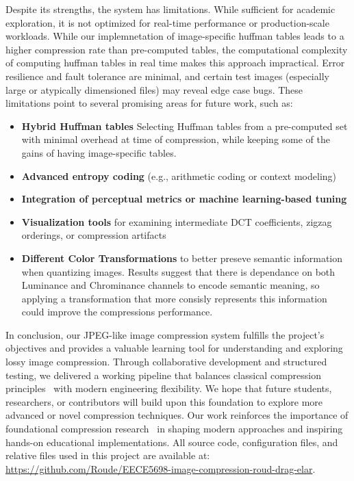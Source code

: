 Despite its strengths, the system has limitations. 
While sufficient for academic exploration, it is not optimized for real-time performance or production-scale workloads. While our implemnetation of image-specific huffman tables leads to a higher compression rate than pre-computed tables, the computational complexity of computing huffman tables in real time makes this approach impractical. Error resilience and fault tolerance are minimal, and certain test images (especially large or atypically dimensioned files) may reveal edge case bugs. These limitations point to several promising areas for future work, such as:

\begin{itemize}
    \item \textbf{Hybrid Huffman tables} Selecting Huffman tables from a pre-computed set with minimal overhead at time of compression, while keeping some of the gains of having image-specific tables.
    \item \textbf{Advanced entropy coding} (e.g., arithmetic coding or context modeling)
    \item \textbf{Integration of perceptual metrics or machine learning-based tuning}
    \item \textbf{Visualization tools} for examining intermediate DCT coefficients, zigzag orderings, or compression artifacts
    \item \textbf{Different Color Transformations} to better preseve semantic information when quantizing images. Results suggest that there is dependance on both Luminance and Chrominance channels to encode semantic meaning, so applying a transformation that more consisly represents this information could improve the compressions performance.
\end{itemize}

In conclusion, our JPEG-like image compression system fulfills the project’s objectives and provides a valuable learning tool for understanding and exploring lossy image compression. Through collaborative development and structured testing, we delivered a working pipeline that balances classical compression principles~\cite{jpegOverview2025} with modern engineering flexibility. We hope that future students, researchers, or contributors will build upon this foundation to explore more advanced or novel compression techniques. Our work reinforces the importance of foundational compression research~\cite{haines1992compression} in shaping modern approaches and inspiring hands-on educational implementations.
All source code, configuration files, and relative files used in this project are available at: \url{https://github.com/Roude/EECE5698-image-compression-roud-drag-elar}.